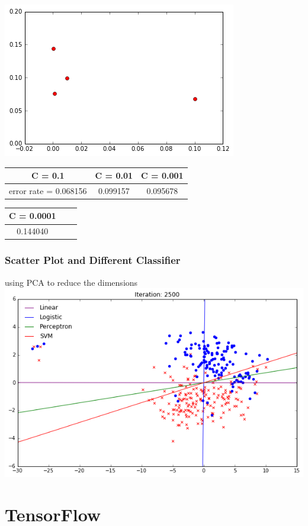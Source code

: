 \documentclass{article}
\begin{document}
\subsubsection{}
\includegraphics[width = .8\textwidth]{svm_differentC.png}\\
\begin{tabular}{ccc}
\hline
C = 0.1 & C = 0.01& C = 0.001\\
\hline
error rate = 0.068156& 0.099157&0.095678 \\
\hline
\end{tabular}
\begin{tabular}{ccc}
\hline
C = 0.0001\\
\hline
0.144040\\
\hline
\end{tabular}

\subsubsection{Scatter Plot and Different Classifier}
using PCA to reduce the dimensions\\
\includegraphics[width = .8\textwidth]{PCA.png}

\section{TensorFlow}
\end{document}
